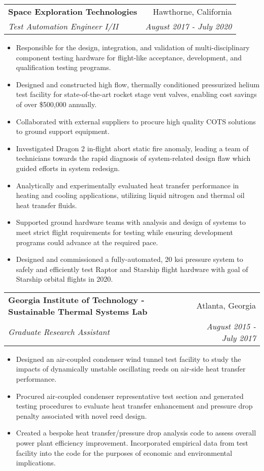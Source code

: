 \documentclass[letterpaper,11pt]{article}
\makeatletter
\newcommand{\resumeItem}[2]{
  \item\small{
    \textbf{#1}{: #2 \vspace{-2pt}}
  }
}
\newcommand{\resumeSubheading}[4]{
  \vspace{-1pt}\item
    \begin{tabular*}{0.97\textwidth}[t]{l@{\extracolsep{\fill}}r}
      \textbf{#1} & #2 \\
      \textit{\small#3} & \textit{\small #4} \\
    \end{tabular*}\vspace{-5pt}
}
\newcommand{\resumeSubSubheading}[2]{
    \begin{tabular*}{0.97\textwidth}{l@{\extracolsep{\fill}}r}
      \textit{\small#1} & \textit{\small #2} \\
    \end{tabular*}\vspace{-5pt}
}
\newcommand{\resumeSubHeadingListEnd}{\end{itemize}}
\newcommand{\resumeItemListStart}{\begin{itemize}}
\newcommand{\resumeItemListEnd}{\end{itemize}\vspace{-5pt}}
\makeatother
\begin{document}

    \resumeSubheading
      {Space Exploration Technologies}{Hawthorne, California}
      {Test Automation Engineer I/II}{August 2017 - July 2020}
      \resumeItemListStart
        	\item{Responsible for the design, integration, and validation of multi-disciplinary component testing hardware for flight-like acceptance, development, and qualification testing programs.}
	\item{Designed and constructed high flow, thermally conditioned pressurized helium test facility for state-of-the-art rocket stage vent valves, enabling cost savings of over \$500,000 annually.}
	\item{Collaborated with external suppliers to procure high quality COTS solutions to ground support equipment.}
	\item{Investigated Dragon 2 in-flight abort static fire anomaly, leading a team of technicians towards the rapid diagnosis of system-related design flaw which guided efforts in system redesign.}
	\item{Analytically and experimentally evaluated heat transfer performance in heating and cooling applications, utilizing liquid nitrogen and thermal oil heat transfer fluids.}
	\item{Supported ground hardware teams with analysis and design of systems to meet strict flight requirements for testing while ensuring development programs could advance at the required pace.}
	\item{Designed and commissioned a fully-automated, 20 ksi pressure system to safely and efficiently test Raptor and Starship flight hardware with goal of Starship orbital flights in 2020.}
      \resumeItemListEnd

    \resumeSubheading
      {Georgia Institute of Technology - Sustainable Thermal Systems Lab}{Atlanta, Georgia}
      {Graduate Research Assistant}{August 2015 - July 2017}
      \resumeItemListStart
        \item{Designed an air-coupled condenser wind tunnel test facility to study the impacts of dynamically unstable oscillating reeds on air-side heat transfer performance.}
        \item{Procured air-coupled condenser representative test section and generated testing procedures to evaluate heat transfer enhancement and pressure drop penalty associated with novel reed design.}
        \item{Created a bespoke heat transfer/pressure drop analysis code to assess overall power plant efficiency improvement. Incorporated empirical data from test facility into the code for the purposes of economic and environmental implications.}
      \resumeItemListEnd
\end{document}
